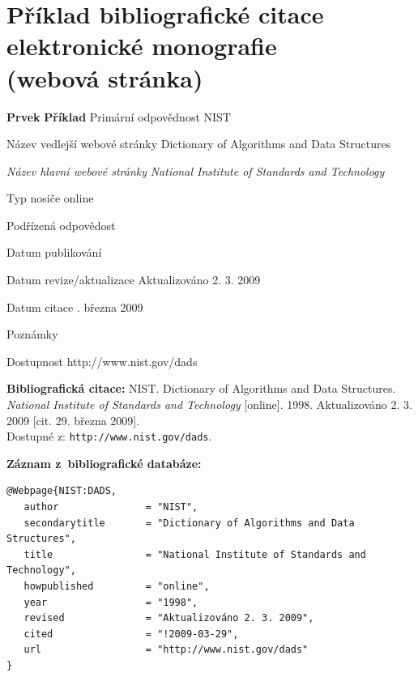 \newpage
\section*{Příklad bibliografické citace elektronické monografie \\
(webová stránka)}
\label{pr-webpage}
\begin{tabbing}
\zarazky
\textbf{Prvek} \> \textbf{Příklad} \odradkovani
Primární odpovědnost \>
NIST

\odradkovani
Název vedlejší webové stránky\>
Dictionary of Algorithms and Data Structures

\odradkovani
{\em Název hlavní webové stránky} \>
{\em National Institute of Standards and Technology}

\odradkovani
Typ nosiče \>
online

\odradkovani
Podřízená odpovědost\footnotemark[1] \>

\odradkovani
Datum publikování 

\odradkovani
Datum revize/aktualizace \>
Aktualizováno 2. 3. 2009

\odradkovani
Datum citace . března 2009

\odradkovani
Poznámky\footnotemark[2] \>

\odradkovani
Dostupnost \>
http://www.nist.gov/dads

\odradkovani
\end{tabbing}

\noindent \textbf{Bibliografická citace:} \odradkovani
NIST. Dictionary of Algorithms and Data Structures. {\em National Institute of Standards and Technology} [online]. 1998. Aktualizováno 2. 3. 2009 [cit. 29. března 2009]. \\
Dostupné z: {\tt http://www.nist.gov/dads}.

\bigskip \bigskip
\noindent \textbf{Záznam z~bibliografické databáze:}
\vspace{-0.5em}
\begin{verbatim}
@Webpage{NIST:DADS,
   author               = "NIST",
   secondarytitle       = "Dictionary of Algorithms and Data Structures",
   title                = "National Institute of Standards and Technology",
   howpublished         = "online",
   year                 = "1998",
   revised              = "Aktualizováno 2. 3. 2009",
   cited                = "!2009-03-29",
   url                  = "http://www.nist.gov/dads"
}
\end{verbatim}

